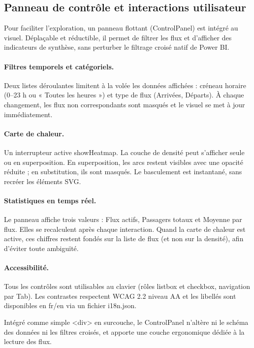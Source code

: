 \subsection{Panneau de contrôle et interactions utilisateur}
\label{subsec:4A-interactions}

Pour faciliter l’exploration, un panneau flottant (ControlPanel) est intégré au visuel. Déplaçable et réductible, il permet de filtrer les flux et d’afficher des indicateurs de synthèse, sans perturber le filtrage croisé natif de Power BI.

\paragraph{Filtres temporels et catégoriels.}
Deux listes déroulantes limitent à la volée les données affichées : créneau horaire (0–23 h ou « Toutes les heures ») et type de flux (Arrivées, Départs). À chaque changement, les flux non correspondants sont masqués et le visuel se met à jour immédiatement.

\paragraph{Carte de chaleur.}
Un interrupteur active showHeatmap. La couche de densité peut s’afficher seule ou en superposition. En superposition, les arcs restent visibles avec une opacité réduite ; en substitution, ils sont masqués. Le basculement est instantané, sans recréer les éléments SVG.

\paragraph{Statistiques en temps réel.}
Le panneau affiche trois valeurs : Flux actifs, Passagers totaux et Moyenne par flux. Elles se recalculent après chaque interaction. Quand la carte de chaleur est active, ces chiffres restent fondés sur la liste de flux (et non sur la densité), afin d’éviter toute ambiguïté.

\paragraph{Accessibilité.}
Tous les contrôles sont utilisables au clavier (rôles listbox et checkbox, navigation par Tab). Les contrastes respectent WCAG 2.2 niveau AA et les libellés sont disponibles en fr/en via un fichier i18n.json.

Intégré comme simple <div> en surcouche, le ControlPanel n’altère ni le schéma des données ni les filtres croisés, et apporte une couche ergonomique dédiée à la lecture des flux.
